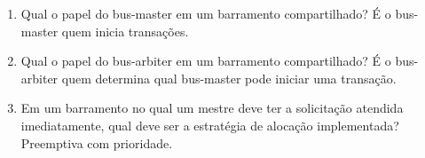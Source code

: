 \documentclass{article}
\begin{document}
\begin{enumerate}
\item Qual o papel do bus-master em um barramento compartilhado? É o bus-master quem inicia transações.

\item Qual o papel do bus-arbiter em um barramento compartilhado? É o bus-arbiter quem determina qual bus-master pode iniciar uma transação.

\item Em um barramento no qual um mestre deve ter a solicitação atendida imediatamente, qual deve ser a estratégia de alocação implementada? Preemptiva com prioridade.

\end{enumerate}
\end{document}
